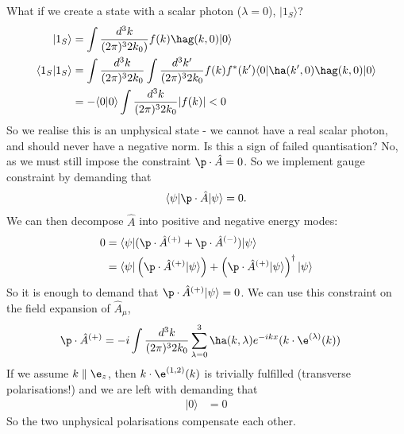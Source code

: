\documentclass[a4paper, 11pt, normalem]{report}
\begin{document}
What if we create a state with a scalar photon ($\lambda=0$), $|1_S\rangle$?
\begin{align}
    |1_S\rangle &= \int \frac{d^3k}{(2\pi)^32k_0)} f(k)\hag(k,0)|0\rangle \\
    \langle1_S|1_S\rangle &= \int \frac{d^3k}{(2\pi)^32k_0} \int \frac{d^3k'}{(2\pi)^32k_0} f(k)f^*(k')\langle0|\ha(k',0)\hag(k,0)|0\rangle \\
                          &= -\langle0|0\rangle \int\frac{d^3k}{(2\pi)^32k_0} |f(k)| < 0
\end{align}
So we realise this is an unphysical state - we cannot have a real scalar photon, and should never have a negative norm.
Is this a sign of failed quantisation?
No, as we must still impose the constraint $\p\cdot\hat{A}=0$.
So we implement gauge constraint by demanding that
\begin{align}
    \langle\psi|\p\cdot\hat{A}|\psi\rangle = 0.
\end{align}
We can then decompose $\hat{A}$ into positive and negative energy modes:
\begin{align}
    0 &= \langle\psi|(\p\cdot\hat{A}^{(+)}+\p\cdot\hat{A}^{(-)})|\psi\rangle \\
      &= \langle\psi|\left(\p\cdot\hat{A}^{(+)}|\psi\rangle\right) + \left(\p\cdot\hat{A}^{(+)}|\psi\rangle\right)^\dagger |\psi\rangle
\end{align}
So it is enough to demand that $\p\cdot\hat{A}^{(+)}|\psi\rangle = 0$.
We can use this constraint on the field expansion of $\hat{A}_\mu$,
\begin{align}
    \p\cdot\hat{A}^{(+)} &= -i\int\frac{d^3k}{(2\pi)^32k_0} \sum_{\lambda=0}^3 \ha(k,\lambda)e^{-ikx}(k\cdot\e^{(\lambda)}(k))
\end{align}
If we assume $k\parallel\e_z$, then $k\cdot\e^{(1,2)}(k)$ is trivially fulfilled (transverse polarisations!) and we are left with demanding that
\begin{align}
    [\ha(k,3) - \ha(k,0)]|0\rangle &= 0
\end{align}
So the two unphysical polarisations compensate each other.
\end{document}
